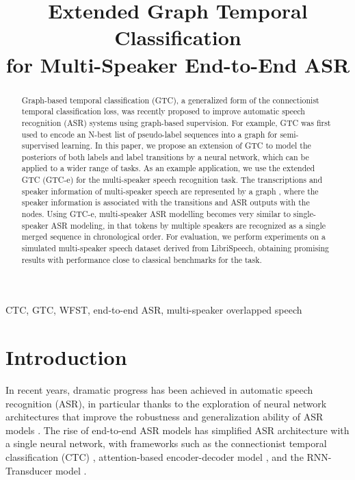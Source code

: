 \documentclass{article}
\title{Extended Graph Temporal Classification\\for Multi-Speaker End-to-End ASR}
\begin{document}
\ninept
\setlength{\abovedisplayskip}{4.5pt}
\setlength{\belowdisplayskip}{4.5pt}
\allowdisplaybreaks

\maketitle

\begin{abstract}

Graph-based temporal classification (GTC), a generalized form of the connectionist temporal classification loss, was recently proposed to improve automatic speech recognition (ASR) systems using graph-based supervision.
For example, GTC was first used to encode an N-best list of pseudo-label sequences into a graph for semi-supervised learning.
In this paper, we propose an extension of GTC to model the posteriors of both labels and label transitions
by a neural network, which can be applied to a wider range of tasks.
As an example application, we use the extended GTC (GTC-e) for the multi-speaker speech recognition task. The transcriptions and speaker information of multi-speaker speech are represented by a graph
, where the speaker information is associated with the transitions and ASR outputs with the nodes. 
Using GTC-e, multi-speaker ASR modelling becomes very similar to single-speaker ASR modeling, in that tokens by multiple speakers are recognized as a single merged sequence in chronological order.
For evaluation, we perform experiments on a simulated multi-speaker speech dataset derived from LibriSpeech, obtaining promising results with performance close to classical benchmarks for the task.
\end{abstract}
%
\begin{keywords}
CTC, GTC, WFST, end-to-end ASR, multi-speaker overlapped speech
\end{keywords}
%
\section{Introduction}
\label{sec:intro}

In recent years, dramatic progress has been achieved in automatic speech recognition (ASR), in particular thanks to the exploration of neural network architectures that improve the robustness and generalization ability of ASR models \cite{qian2016very, graves2013speech, VaswaniSPUJGKP17, gulati2020conformer, guo2021recent}. The rise of end-to-end ASR models has simplified ASR architecture with a single neural network, with frameworks such as the connectionist temporal classification (CTC) \cite{GravesFGS06}, attention-based encoder-decoder model \cite{chan2015listen,kim2017joint,watanabe2017hybrid}, and the RNN-Transducer model \cite{graves2012sequence}.
\end{document}
